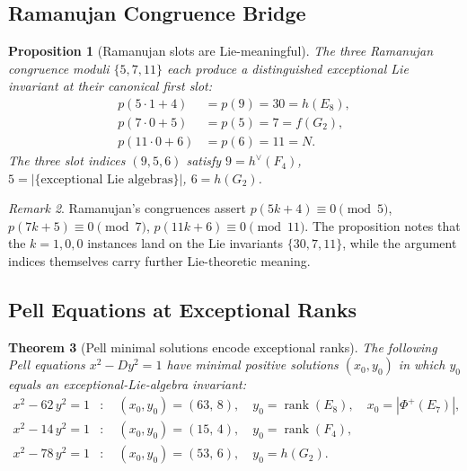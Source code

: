\documentclass[11pt]{amsart}
\theoremstyle{plain}
\newtheorem{theorem}{Theorem}[section]
\newtheorem{proposition}[theorem]{Proposition}
\theoremstyle{definition}
\theoremstyle{remark}
\newtheorem{remark}[theorem]{Remark}
\renewcommand{\Phi}{\varPhi}
\begin{document}
\subsection{Ramanujan Congruence Bridge}\label{subsec:ramanujan-bridge}

\begin{proposition}[Ramanujan slots are Lie-meaningful]%
\label{prop:ramanujan-slots}
The three Ramanujan congruence moduli $\{5,7,11\}$ each produce a
distinguished exceptional Lie invariant at their canonical first slot:
\begin{align}
  p(5\cdot1+4) &= p(9)  = 30 = h(E_8),   \label{eq:ram5}  \\
  p(7\cdot0+5) &= p(5)  = 7  = f(G_2),   \label{eq:ram7}  \\
  p(11\cdot0+6)&= p(6)  = 11 = N.        \label{eq:ram11}
\end{align}
The three slot indices $(9,5,6)$ satisfy
$9 = h^{\vee}(F_4)$, $5 = |\{\text{exceptional Lie algebras}\}|$,
$6 = h(G_2)$.
\end{proposition}

\begin{remark}
Ramanujan's congruences assert $p(5k+4)\equiv0\pmod5$,
$p(7k+5)\equiv0\pmod7$, $p(11k+6)\equiv0\pmod{11}$.
The proposition notes that the $k=1,0,0$ instances land on the Lie
invariants $\{30,7,11\}$, while the argument indices themselves carry
further Lie-theoretic meaning.
\end{remark}

\subsection{Pell Equations at Exceptional Ranks}\label{subsec:pell}

\begin{theorem}[Pell minimal solutions encode exceptional ranks]%
\label{thm:pell-lie}
The following Pell equations $x^2 - Dy^2 = 1$ have minimal positive
solutions $(x_0,y_0)$ in which $y_0$ equals an exceptional-Lie-algebra
invariant:
\begin{align}
  x^2 - 62\,y^2 = 1 &\colon\quad
    (x_0,y_0) = (63,\,8), \quad
    y_0 = \operatorname{rank}(E_8),\quad
    x_0 = |\Phi^+(E_7)|, \label{eq:pell62} \\
  x^2 - 14\,y^2 = 1 &\colon\quad
    (x_0,y_0) = (15,\,4), \quad
    y_0 = \operatorname{rank}(F_4),            \label{eq:pell14} \\
  x^2 - 78\,y^2 = 1 &\colon\quad
    (x_0,y_0) = (53,\,6), \quad
    y_0 = h(G_2).                              \label{eq:pell78}
\end{align}
\end{theorem}
\end{document}
